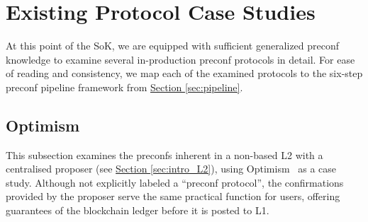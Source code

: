 \documentclass[a4paper]{article}
\theoremstyle{boldstyle}
\begin{document}
\section{Existing Protocol Case Studies}
\label{sec:implementations}
    At this point of the SoK, we are equipped with sufficient generalized preconf knowledge to examine several in-production preconf protocols in detail. For ease of reading and consistency, we map each of the examined protocols to the six-step preconf pipeline framework from \hyperref[sec:pipeline]{Section \ref{sec:pipeline}}.

    \subsection{ \textbf{Optimism}}
        This subsection examines the preconfs inherent in a non-based L2 with a centralised proposer (see \hyperref[sec:intro_L2]{Section \ref{sec:intro_L2}}), using Optimism~\cite{Optimism,W:OptimismDocs} as a case study. Although not explicitly labeled a ``preconf protocol'', the confirmations provided by the proposer serve the same practical function for users, offering guarantees of the blockchain ledger before it is posted to L1.
            
\end{document}
